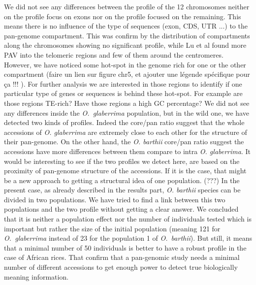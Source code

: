 \documentclass[10pt,letterpaper]{article}
\begin{document}
We did not see any differences between the profile of the 12 chromosomes neither on the profile focus on exons nor on the profile focused on the remaining. This means there is no influence of the type of sequences (exon, CDS, UTR ...) to the pan-genome 
compartment. This was confirm by the distribution of compartments along the chromosomes showing no significant profile, while Lu et al \cite{Lu2015} found more PAV into the telomeric regions and few of them around the centromeres. However, we have noticed some hot-spot in the genome rich for one or the other compartment (faire un lien sur figure chr5, et ajouter une légende spécifique pour ça !!! ). For further analysis we are interested in those regions to identify if one particular type of genes or sequences is behind these hot-spot. For example are those regions TE-rich? Have those regions a high GC percentage? 
We did not see any differences inside the \emph{O.~glaberrima} population, but in the wild one, we have detected two 
% 
% 
kinds of profiles. Indeed the core/pan ratio suggest that the whole accessions of \textit{O. glaberrima} are extremely close to each other for the structure of their pan-genome. On the other hand, the \textit{O. barthii} core/pan ratio suggest the accessions have more differences between them compare to intra \textit{O. glaberrima}. It would be interesting to see if the two profiles we detect here, are based on the proximity of pan-genome structure of the accessions. If it is the case, that might be a new approach to getting a structural idea of one population. (???)
In the present case, as already described in the results part, \textit{O. barthii} species can be divided in two populations. We have tried to find a link between this two populations and the two profile without getting a clear answer. We concluded that it is neither a population effect nor the number of individuals tested which is important but rather the size of the initial population (meaning 121 for \emph{O.~glaberrima} instead of 23 for the population 1 of \emph{O.~barthii}). But still, it means that a minimal number of 50 individuals is better to have a robust profile in the case of African rices. That confirm that a pan-genomic study needs a minimal number of different accessions to get enough power to detect true biologically meaning information. 
\end{document}
